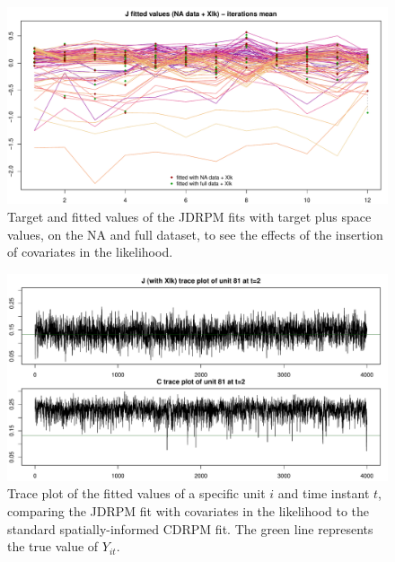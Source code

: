 \documentclass[12pt,	%
	a4paper,		%
	twoside,		%
	openright,		%
	titlepage,%
	]{book}
\theoremstyle{definition}
\begin{document}
\begin{figure}[!ht]
    \centering
    \includegraphics[width=1\linewidth]{Testing/Covariates/NA lk improvement/J_mean_prediction_NA.pdf}
    \caption[Target and fitted values of JDRPM fits, target plus space values, NA dataset, with covariates in the likelihood]{Target and fitted values of the JDRPM fits with target plus space values, on the NA and full dataset, to see the effects of the insertion of covariates in the likelihood.}
    \label{fig: all NA fitted values tests}
\end{figure}

\begin{figure}[!ht]
    \centering
    \includegraphics[width=1\linewidth]{Testing/Covariates/NA lk improvement/trace_plots_with_Xlk.pdf}
    \caption[Trace plot of the fitted values for a specific unit and time, from a fit with covariates in the likelihood]{Trace plot of the fitted values of a specific unit $i$ and time instant $t$, comparing the JDRPM fit with covariates in the likelihood to the standard spatially-informed CDRPM fit. The green line represents the true value of $Y_{it}$.}
    \label{fig: trace plot with Xlk}
\end{figure}
\end{document}
